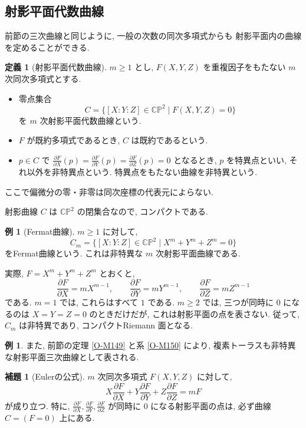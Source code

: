 \documentclass[dvipdfmx,a4paper,11pt]{article} %
\newcommand{\C}{\mathbb{C}}
\theoremstyle{definition}
\numberwithin{equation}{section}
\newtheorem{lem}[thm]{補題}
\newtheorem{dfn}[thm]{定義}
\newtheorem{exa}[thm]{例}
\begin{document}
\subsection{射影平面代数曲線}\label{O-S030}

前節の三次曲線と同じように, 一般の次数の同次多項式からも
射影平面内の曲線を定めることができる.

\begin{dfn}[射影平面代数曲線]\label{O-M168}
$m\geq1$ とし, $F(X,Y,Z)$ を重複因子をもたない $m$ 次同次多項式とする.
\begin{itemize}
\item 零点集合
\[
C=\{[X:Y:Z]\in\C\mathbb P^2\mid F(X,Y,Z)=0\}
\]
を $m$ 次射影平面代数曲線という.
\item $F$ が既約多項式であるとき, $C$ は既約であるという.
\item $p\in C$ で $\frac{\partial F}{\partial X}(p)=\frac{\partial F}{\partial Y}(p)=\frac{\partial F}{\partial Z}(p)=0$ となるとき,
$p$ を特異点といい, それ以外を非特異点という.
特異点をもたない曲線を非特異という.
\end{itemize}
ここで偏微分の零・非零は同次座標の代表元によらない.
\end{dfn}

射影曲線 $C$ は $\C\mathbb P^2$ の閉集合なので, コンパクトである.


\begin{exa}[Fermat曲線]\label{O-M170}
$m\geq1$ に対して, 
\[
C_m=\{[X:Y:Z]\in\C\mathbb P^2\mid X^m+Y^m+Z^m=0\}
\]
をFermat曲線という.
これは非特異な $m$ 次射影平面曲線である.

実際, $F=X^m+Y^m+Z^m$ とおくと, 
\[
\frac{\partial F}{\partial X}=mX^{m-1},\qquad
\frac{\partial F}{\partial Y}=mY^{m-1},\qquad
\frac{\partial F}{\partial Z}=mZ^{m-1}
\]
である.
$m=1$ では, これらはすべて $1$ である.
$m\geq2$ では, 三つが同時に $0$ になるのは
$X=Y=Z=0$ のときだけだが, 
これは射影平面の点を表さない.
従って, $C_m$ は非特異であり, コンパクトRiemann 面となる.
\end{exa}
\begin{exa}
また, 前節の定理 \ref{O-M149} と系 \ref{O-M150} により, 
複素トーラスも非特異な射影平面三次曲線として表される.
\end{exa}




\begin{lem}[Eulerの公式]\label{O-M169}
$m$ 次同次多項式 $F(X,Y,Z)$ に対して, 
\[
X\frac{\partial F}{\partial X}+Y\frac{\partial F}{\partial Y}+Z\frac{\partial F}{\partial Z}=mF
\]
が成り立つ.
特に, $\frac{\partial F}{\partial X},\frac{\partial F}{\partial Y},\frac{\partial F}{\partial Z}$ が同時に $0$ になる射影平面の点は, 
必ず曲線 $C=(F=0)$ 上にある.
\end{lem}
\end{document}
